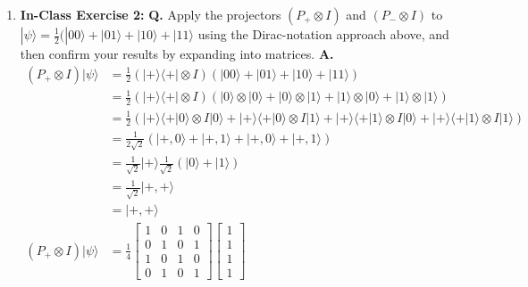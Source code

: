 \documentclass[main.tex]{subfiles}
\begin{document}
\begin{enumerate}
\item[] \textbf{In-Class Exercise 2:} \textbf{Q.} Apply the projectors $\left(P_{+} \otimes I\right)$ and $\left(P_{-} \otimes I\right)$ to $|\psi\rangle=\frac{1}{2}(|00\rangle+|01\rangle+|10\rangle+|11\rangle$ using the Dirac-notation approach above, and then confirm your results by expanding into matrices. \textbf{A.}
    \begin{align*}
        \left(P_{+} \otimes I\right)|\psi\rangle    & = \frac{1}{2}(|+\rangle\langle+|\otimes I)
                                                    (|00\rangle+|01\rangle+|10\rangle+|11\rangle)\\
                                                    & = \frac{1}{2}(|+\rangle\langle+|\otimes I)
                                                    (|0\rangle\otimes|0\rangle + |0\rangle\otimes|1\rangle +
                                                    |1\rangle\otimes|0\rangle + |1\rangle\otimes|1\rangle)\\
                                                    & = \frac{1}{2}(|+\rangle\langle+|0\rangle\otimes I|0\rangle + |+\rangle\langle+|0\rangle\otimes I|1\rangle +
                                                    |+\rangle\langle+|1\rangle\otimes I|0\rangle + 
                                                    |+\rangle\langle+|1\rangle\otimes I|1\rangle)\\ 
                                                    & = \frac{1}{2\sqrt{2}}(|+,0\rangle + |+,1\rangle + |+,0\rangle + |+,1\rangle)\\
                                                    & = \frac{1}{\sqrt{2}}|+\rangle\frac{1}{\sqrt{2}}(|0\rangle+|1\rangle)\\
                                                    & = \frac{1}{\sqrt{2}}|+,+\rangle\\
                                                    & = |+,+\rangle \tag{normalized}\\ 
        \left(P_{+} \otimes I\right)|\psi\rangle    & = \frac{1}{4}\left[\begin{array}{llll}1&0&1&0\\0&1&0&1\\
                                                    1&0&1&0\\0&1&0&1\end{array}\right]
                                                    \left[\begin{array}{l}1\\1\\1\\1\end{array}\right]\\

\end{align*}
\end{enumerate}
\end{document}
